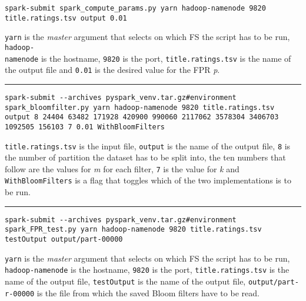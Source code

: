 \begin{lstlisting}[basicstyle=\ttfamily\footnotesize, breaklines=true, backgroundcolor = \color{lightgray}]
spark-submit spark_compute_params.py yarn hadoop-namenode 9820 title.ratings.tsv output 0.01
\end{lstlisting}
\hfill \break
\texttt{yarn} is the \textit{master} argument that selects on which FS the script has to be run, \texttt{hadoop-\\namenode} is the hostname, \texttt{9820} is the port, \texttt{title.ratings.tsv} is the name of the output file and \texttt{0.01} is the desired value for the FPR \textit{p}.
\vspace{5pt}
\hrule
\vspace{6pt}
\begin{lstlisting}[basicstyle=\ttfamily\footnotesize,breaklines=true, backgroundcolor = \color{lightgray}]
spark-submit --archives pyspark_venv.tar.gz#environment spark_bloomfilter.py yarn hadoop-namenode 9820 title.ratings.tsv output 8 24404 63482 171928 420900 990060 2117062 3578304 3406703 1092505 156103 7 0.01 WithBloomFilters
\end{lstlisting}
\hfill \break
\texttt{title.ratings.tsv} is the input file, \texttt{output} is the name of the output file, \texttt{8} is the number of partition the dataset has to be split into, the ten numbers that follow are the values for \textit{m} for each filter, \texttt{7} is the value for \textit{k} and \texttt{WithBloomFilters} is a flag that toggles which of the two implementations is to be run.
\vspace{5pt}
\hrule
\vspace{6pt}
\begin{lstlisting}[basicstyle=\ttfamily\footnotesize, breaklines=true, backgroundcolor = \color{lightgray}]
spark-submit --archives pyspark_venv.tar.gz#environment spark_FPR_test.py yarn hadoop-namenode 9820 title.ratings.tsv testOutput output/part-00000
\end{lstlisting}
\hfill \break
\texttt{yarn} is the \textit{master } argument that selects on which FS the script has to be run, \texttt{hadoop-namenode} is the hostname, \texttt{9820} is the port, \texttt{title.ratings.tsv} is the name of the output file, \texttt{testOutput} is the name of the output file, \texttt{output/part-r-00000} is the file from which the saved Bloom filters have to be read.